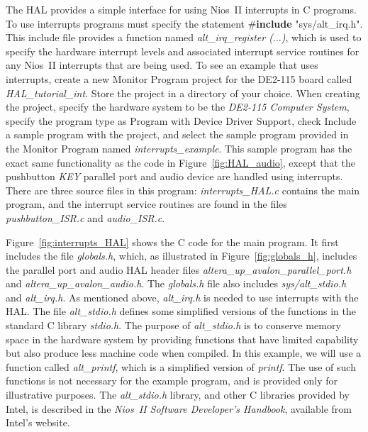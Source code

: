\documentclass[11pt, twoside, pdftex]{article}
\begin{document}
The HAL provides a simple interface for using Nios~II interrupts in C programs. To use interrupts programs must 
specify the statement \#{\bf include} "sys/alt\_irq.h". This include file provides a function named 
{\it alt\_irq\_register ($\ldots$)}, which is used to specify the hardware interrupt levels and associated 
interrupt service routines for any Nios~II interrupts that are being used. To see an example that uses interrupts,
create a new Monitor Program project for the 
DE2-115 board called {\it HAL\_tutorial\_int}. Store the project in a directory of your choice. 
When creating the project, specify the hardware system to be the {\it DE2-115 Computer System},
specify the program type as {\sf Program with Device Driver Support}, check {\sf Include a sample program with the project}, 
and select the sample program provided in the Monitor Program named {\it interrupts\_example}.  This sample program has the exact same functionality 
as the code in
Figure~\ref{fig:HAL_audio}, except that the pushbutton {\it KEY} parallel port and audio device 
are handled using interrupts. There are three source files in this program:
{\it interrupts\_HAL.c} contains the main program, and the interrupt service routines are found in the files
{\it pushbutton\_ISR.c} and {\it audio\_ISR.c}.

Figure~\ref{fig:interrupts_HAL} shows the C code for the main program. It first includes the file {\it globals.h},
which, as illustrated in Figure~\ref{fig:globals_h}, includes the parallel port and audio HAL header files 
{\it altera\_up\_avalon\_parallel\_port.h} and {\it altera\_up\_avalon\_audio.h}.
The {\it globals.h} file also includes {\it sys/alt\_stdio.h} and
{\it alt\_irq.h}.  As mentioned above, {\it alt\_irq.h} is needed to use interrupts with the HAL. The file 
{\it alt\_stdio.h} defines some simplified versions of the functions in the standard C library {\it stdio.h}.
The purpose of {\it alt\_stdio.h} is to conserve memory space in the hardware system by providing functions that
have limited capability but also produce less machine code when compiled.  In this example, we will use a 
function called {\it alt\_printf}, which is a simplified version of {\it printf}. The use of such functions is
not necessary for the example program, and is provided only for illustrative purposes. The {\it alt\_stdio.h} 
library, and other C libraries provided by Intel, is described in the {\it Nios~II Software Developer's Handbook},
available from Intel's website.
\end{document}

